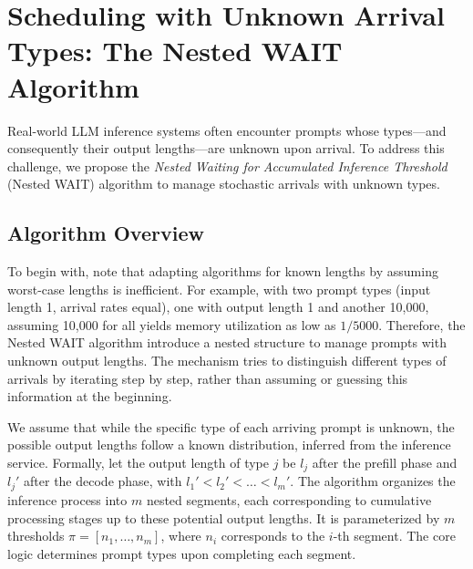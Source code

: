 \section{Scheduling with Unknown Arrival Types: The Nested WAIT Algorithm}
\label{sec:nested_wait}
Real-world LLM inference systems often encounter prompts whose types—and consequently their output lengths—are unknown upon arrival. To address this challenge, we propose the \textit{Nested Waiting for Accumulated Inference Threshold} (Nested WAIT) algorithm to manage stochastic arrivals with unknown types.

\subsection{Algorithm Overview}

To begin with, note that adapting algorithms for known lengths by assuming worst-case lengths is inefficient. For example, with two prompt types (input length 1, arrival rates equal), one with output length 1 and another 10,000, assuming 10,000 for all yields memory utilization as low as \( 1/5000 \). Therefore, the Nested WAIT algorithm introduce a nested structure to manage prompts with unknown output lengths. The mechanism tries to distinguish different types of arrivals by iterating step by step, rather than assuming or guessing this information at the beginning. 

We assume that while the specific type of each arriving prompt is unknown, the possible output lengths follow a known distribution, inferred from the inference service. Formally, let the output length of type \( j \) be \( l_j \) after the prefill phase and \( l_j' \) after the decode phase, with \( l_1' < l_2' < \dots < l_m' \). The algorithm organizes the inference process into \( m \) nested segments, each corresponding to cumulative processing stages up to these potential output lengths. It is parameterized by \( m \) thresholds \( \pi = [n_1, \dots, n_m] \), where \( n_i \) corresponds to the \( i \)-th segment. The core logic determines prompt types upon completing each segment.

